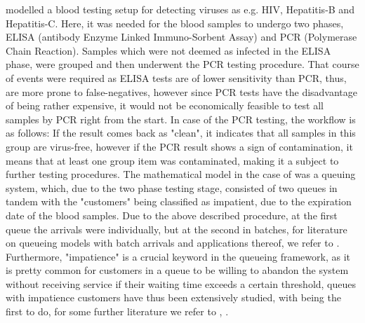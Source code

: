 \documentclass[11pt,a4paper]{article}
\begin{document}
\begin{spacing}{1.8}
 \citet{BarLev2011} modelled a blood testing setup for detecting viruses as e.g. HIV, Hepatitis-B and Hepatitis-C. Here, it was needed for the blood samples to undergo two  phases, ELISA (antibody Enzyme Linked Immuno-Sorbent Assay) and PCR (Polymerase Chain Reaction). Samples which were not deemed as infected in the ELISA phase, were grouped and then underwent the PCR testing procedure. That course of events were required as ELISA tests are of lower sensitivity than PCR, thus, are more prone to false-negatives, however since PCR tests have the disadvantage of being rather expensive, it would not be economically feasible to test all samples by PCR right from the start. In case of the PCR testing, the workflow is as follows: If the result comes back as "clean", it indicates that all samples in this group are virus-free, however if the PCR result shows a sign of contamination, it means that at least one group item was contaminated, making it a subject to further testing procedures. The mathematical model in the case of \citep{BarLev2011} was a queuing system, which, due to the two phase testing stage, consisted of two queues in tandem with the "customers" being classified as impatient, due to the expiration date of the blood samples. Due to the above described procedure, at the first queue the arrivals were individually, but at the second in batches, for literature on queueing models with batch arrivals and applications thereof, we refer to \citep{Chaudhry1983} \citep{Reddy1998} \citep{Bansal2003} \citep{Tadj2003} \citep{CHANG2005} \citep{Reddy1998} \citep{BarLev2007} \citep{Zisgen2022}. Furthermore, "impatience" is a crucial keyword in the queueing framework, as it is pretty common for customers in a queue to be willing to abandon the system without receiving service if their waiting time exceeds a certain threshold, queues with impatience customers have thus been extensively studied, with \citep{Barrer1957} being the first to do,  for some further literature we refer to  \citep{Kok1985}, \citep{Boots1999} \citep{Wang2010}. \medskip

\end{spacing}
\end{document}
